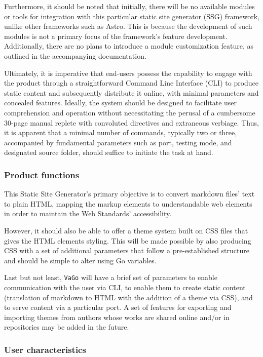 Furthermore, it should be noted that initially, there will be no
available modules or tools for integration with this particular static
site generator (SSG) framework, unlike other frameworks such as Astro.
This is because the development of such modules is not a primary focus
of the framework's feature development. Additionally, there are no plans
to introduce a module customization feature, as outlined in the
accompanying documentation.

Ultimately, it is imperative that end-users possess the capability to
engage with the product through a straightforward Command Line Interface
(CLI) to produce static content and subsequently distribute it online,
with minimal parameters and concealed features. Ideally, the system
should be designed to facilitate user comprehension and operation
without necessitating the perusal of a cumbersome 30-page manual replete
with convoluted directives and extraneous verbiage. Thus, it is apparent
that a minimal number of commands, typically two or three, accompanied
by fundamental parameters such as port, testing mode, and designated
source folder, should suffice to initiate the task at hand.

\subsubsection{Product functions}\label{subsubsec:product-functions}

This Static Site Generator's primary objective is to convert markdown
files' text to plain HTML, mapping the markup elements to understandable
web elements in order to maintain the Web Standards' accessibility\cite{accwai}\cite{basismoz}.

However, it should also be able to offer a theme system built on CSS
files that gives the HTML elements styling. This will be made possible
by also producing CSS with a set of additional parameters that follow a
pre-established structure and should be simple to alter using Go
variables.

Last but not least, \texttt{VaGo} will have a brief set of parameters to
enable communication with the user via CLI, to enable them to create
static content (translation of markdown to HTML with the addition of a
theme via CSS), and to serve content via a particular port. A set of
features for exporting and importing themes from authors whose works are
shared online and/or in repositories may be added in the future.

\subsubsection{User characteristics}\label{subsubsec:user-characteristics}

